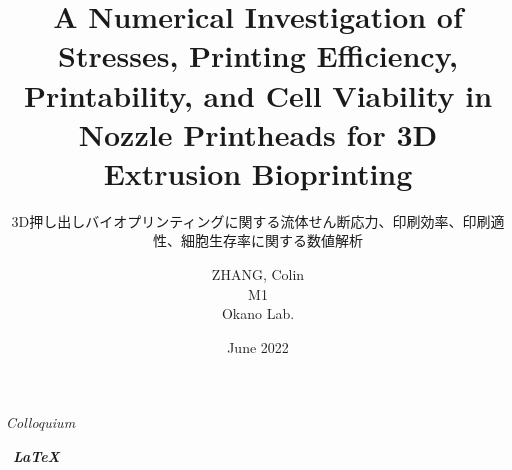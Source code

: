 \documentclass[sansserif, mathserif, 12pt, aspectratio=169]{beamer}
\title[Numerical Investigation of Bioprinting Printheads]{\normalsize A Numerical Investigation of Stresses, Printing Efficiency, Printability, and Cell Viability in Nozzle Printheads for 3D Extrusion Bioprinting}
\subtitle{\small 3D押し出しバイオプリンティングに関する流体せん断応力、印刷効率、印刷適性、細胞生存率に関する数値解析}
\author[Okano Lab.]{
                    ZHANG, Colin
                    \texorpdfstring{\\ M1}{}
                    \texorpdfstring{\\ Okano Lab.}{}
                    }
\date{June 2022}
\newcommand{\credit}[1]{\par\hfill \normalsize ~\itshape#1}
\begin{document}
\begin{frame}[noframenumbering]{\textit{Colloquium}}
\begin{CJK}{UTF8}{ipxm}
  \titlepage
\end{CJK}
\credit{{\selectfont\rm\textbf{\color{darkblue}\LaTeX}}}\hspace{-2mm}
\end{frame}


\end{document}
